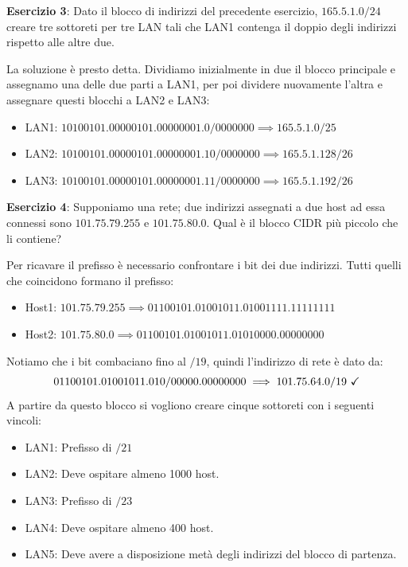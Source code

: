 \noindent \textbf{Esercizio 3}: Dato il blocco di indirizzi del precedente esercizio, $165.5.1.0/24$ creare tre sottoreti per tre LAN tali che LAN1
contenga il doppio degli indirizzi rispetto alle altre due.\newline

\noindent La soluzione è presto detta. Dividiamo inizialmente in due il blocco principale e assegnamo una delle due parti a LAN1, per poi dividere
nuovamente l'altra e assegnare questi blocchi a LAN2 e LAN3: \begin{itemize}
	\item LAN1: $10100101.00000101.00000001.0/0000000 \implies 165.5.1.0/25$ \checkmark
	\item LAN2: $10100101.00000101.00000001.10/0000000 \implies 165.5.1.128/26$ \checkmark
	\item LAN3: $10100101.00000101.00000001.11/0000000 \implies 165.5.1.192/26$ \checkmark
\end{itemize}

\noindent \textbf{Esercizio 4}: Supponiamo una rete; due indirizzi assegnati a due host ad essa connessi sono $101.75.79.255$ e $101.75.80.0$. Qual è
il blocco CIDR più piccolo che li contiene?\newline

\noindent Per ricavare il prefisso è necessario confrontare i bit dei due indirizzi. Tutti quelli che coincidono formano il prefisso: \begin{itemize}
	\item Host1: $101.75.79.255 \implies 01100101.01001011.01001111.11111111$
	\item Host2: $101.75.80.0 \implies 01100101.01001011.01010000.00000000$
\end{itemize}
\noindent Notiamo che i bit combaciano fino al $/19$, quindi l'indirizzo di rete è dato da: \[
	01100101.01001011.010/00000.00000000 \implies 101.75.64.0/19 \text{ \checkmark}
\]
\noindent A partire da questo blocco si vogliono creare cinque sottoreti con i seguenti vincoli: \begin{itemize}
	\item LAN1: Prefisso di $/21$
	\item LAN2: Deve ospitare almeno 1000 host.
	\item LAN3: Prefisso di $/23$
	\item LAN4: Deve ospitare almeno 400 host.
	\item LAN5: Deve avere a disposizione metà degli indirizzi del blocco di partenza.
\end{itemize}

